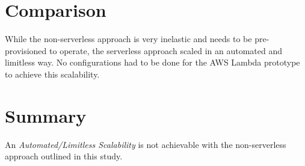 \section{Comparison}\label{chp:suitComp}

While the non-serverless approach is very inelastic and needs to be pre-provisioned to operate, the serverless approach scaled in an automated and limitless way. No configurations had to be done for the AWS Lambda prototype to achieve this scalability. 

\section{Summary}

An \textit{Automated/Limitless Scalability} is not achievable with the non-serverless approach outlined in this study. 